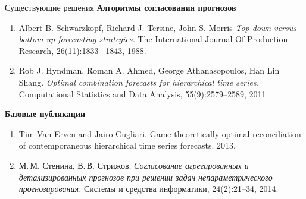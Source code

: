\documentclass{beamer}
\begin{document}
\begin{frame}{Существующие решения}
    \small
    \textbf{Алгоритмы согласования прогнозов}
    \begin{enumerate}
        \item Albert B. Schwarzkopf, Richard J. Tersine, John S.
        Morris \textit{Top-down versus
        bottom-up forecasting strategies.} The International Journal Of
        Production Research, 26(11):1833–-1843, 1988.
        \item Rob J. Hyndman, Roman A. Ahmed, George Athanasopoulos, Han Lin Shang. \textit{Optimal
        combination forecasts for hierarchical time series.} Computational
        Statistics and Data Analysis, 55(9):2579–2589, 2011.
    \end{enumerate}

    \textbf{Базовые публикации}
    \begin{enumerate}
        \item Tim Van Erven and Jairo Cugliari. Game-theoretically optimal reconciliation of contemporaneous
        hierarchical time series forecasts. 2013.
        \item М.\,М. Стенина, В.\,В. Стрижов. \textit{Согласование агрегированных и
        детализированных прогнозов при решении задач непараметрического прогнозирования.}
        Системы и средства информатики, 24(2):21–34, 2014.
    \end{enumerate}
\end{frame}
\end{document}
